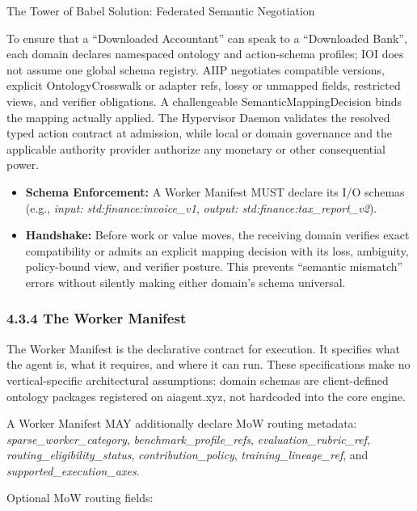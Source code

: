 \documentclass[
  11pt,
]{article}
\providecommand{\tightlist}{%
  \setlength{\itemsep}{0pt}\setlength{\parskip}{0pt}}
\begin{document}
The Tower of Babel Solution: Federated Semantic Negotiation

To ensure that a ``Downloaded Accountant'' can speak to a ``Downloaded
Bank'', each domain declares namespaced ontology and action-schema profiles;
IOI does not assume one global schema registry. AIIP negotiates compatible
versions, explicit OntologyCrosswalk or adapter refs, lossy or unmapped fields,
restricted views, and verifier obligations. A challengeable
SemanticMappingDecision binds the mapping actually applied. The Hypervisor
Daemon validates the resolved typed action contract at admission, while local
or domain governance and the applicable authority provider authorize any
monetary or other consequential power.

\begin{itemize}
\tightlist
\item
  \textbf{Schema Enforcement:} A Worker Manifest MUST declare its I/O
  schemas (e.g., \emph{\emph{input: std:finance:invoice\_v1}},
  \emph{\emph{output: std:finance:tax\_report\_v2}}).
\item
  \textbf{Handshake:} Before work or value moves, the receiving domain
  verifies exact compatibility or admits an explicit mapping decision with
  its loss, ambiguity, policy-bound view, and verifier posture. This prevents
  ``semantic mismatch'' errors without silently making either domain's schema
  universal.
\end{itemize}

\hypertarget{the-worker-manifest}{%
\subsubsection{4.3.4 The Worker Manifest}\label{the-worker-manifest}}

The Worker Manifest is the declarative contract for execution. It
specifies what the agent is, what it requires, and where it can run.
These specifications make no vertical-specific architectural
assumptions: domain schemas are client-defined ontology packages
registered on aiagent.xyz, not hardcoded into the core engine.

A Worker Manifest MAY additionally declare MoW routing metadata:
\emph{sparse\_worker\_category}, \emph{benchmark\_profile\_refs},
\emph{evaluation\_rubric\_ref}, \emph{routing\_eligibility\_status},
\emph{contribution\_policy}, \emph{training\_lineage\_ref}, and
\emph{supported\_execution\_axes}.

Optional MoW routing fields:
\end{document}
